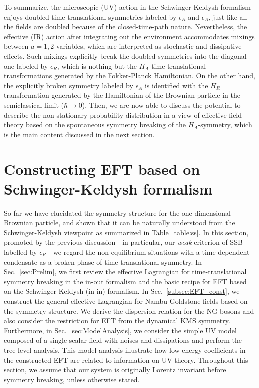 \documentclass[a4paper,11pt]{article}
\begin{document}
To summarize, the microscopic (UV) action 
in the Schwinger-Keldysh formalism enjoys doubled 
time-translational symmetries labeled by 
$\epsilon_R$ and $\epsilon_A$, just like all the fields are doubled 
because of the closed-time-path nature. 
Nevertheless, 
the effective (IR) action after integrating out the environment accommodates 
mixings between $a=1,2$ variables, which are interpreted as 
stochastic and dissipative effects. 
Such mixings explicitly break the doubled symmetries into the diagonal one 
labeled by $\epsilon_R$, which is nothing but the $H_A$ time-translational 
transformations generated by the Fokker-Planck Hamiltonian. 
On the other hand, the explicitly broken symmetry labeled by $\epsilon_A$ 
is identified with the $H_R$ transformation generated by the Hamiltonian of 
the Brownian particle in the semiclassical limit ($\hbar \to 0$). 
Then, we are now able to discuss the potential to describe the non-stationary 
probability distribution in a view of effective field theory 
based on the spontaneous symmetry breaking of the 
$H_A$-symmetry, 
which is the main content discussed in the next section.



\section{Constructing EFT based on Schwinger-Keldysh formalism}
\label{section:ConstructingEFT}

So far we have elucidated the symmetry structure for the one dimensional 
Brownian particle, and shown that it can be naturally understood from the 
Schwinger-Keldysh viewpoint as summarized in Table~\ref{table:ss}.
In this section, promoted by the previous  discussion---in particular, 
our \textit{weak} criterion of SSB labelled by $\epsilon_R$---we regard the 
non-equilibrium situations with a time-dependent condensate as a 
broken phase of time-translational symmetry.
In Sec.~\ref{sec:Prelim}, 
we first review the effective Lagrangian for time-translational symmetry 
breaking in the in-out formalism and the basic recipe for EFT 
based on the Schwinger-Keldysh (in-in) formalism. 
In Sec.~\ref{subsec:EFT_const}, we construct the general effective Lagrangian
for Nambu-Goldstone fields based on the symmetry structure. 
We derive the dispersion relation for the NG bosons and 
also consider the restriction for EFT from the dynamical KMS symmetry. 
Furthermore, in Sec.~\ref{sec:ModelAnalysis}, 
we consider the simple UV model composed of a single scalar field 
with noises and dissipations and perform the tree-level analysis.
This model analysis illustrate how low-energy coefficients in the 
constructed EFT are related to information on UV theory.
Throughout this section, we assume that our system is originally 
Lorentz invariant before symmetry breaking, unless otherwise stated.
\end{document}
